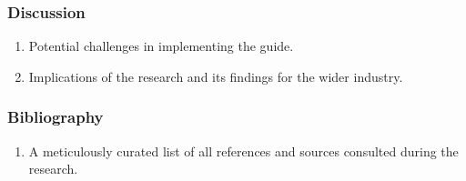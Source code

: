 \subsubsection{Discussion}
\begin{enumerate}
    \item Potential challenges in implementing the guide.
    \item Implications of the research and its findings for the wider industry.
\end{enumerate}

\subsubsection{Bibliography}
\begin{enumerate}
    \item A meticulously curated list of all references and sources consulted during the research.
\end{enumerate}
